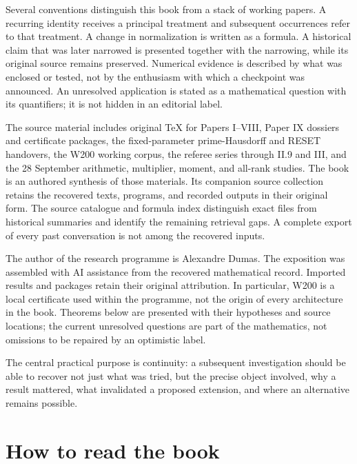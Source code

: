 \documentclass[
  10pt,
  a4paper,
  10pt,
  oneside,
  openany]{book}
\begin{document}
Several conventions distinguish this book from a stack of working
papers. A recurring identity receives a principal treatment and
subsequent occurrences refer to that treatment. A change in
normalization is written as a formula. A historical claim that was later
narrowed is presented together with the narrowing, while its original
source remains preserved. Numerical evidence is described by what was
enclosed or tested, not by the enthusiasm with which a checkpoint was
announced. An unresolved application is stated as a mathematical
question with its quantifiers; it is not hidden in an editorial label.

The source material includes original TeX for Papers I--VIII, Paper IX
dossiers and certificate packages, the fixed-parameter prime-Hausdorff
and RESET handovers, the W200 working corpus, the referee series through
II.9 and III, and the 28 September arithmetic, multiplier, moment, and
all-rank studies. The book is an authored synthesis of those materials.
Its companion source collection retains the recovered texts, programs,
and recorded outputs in their original form. The source catalogue and
formula index distinguish exact files from historical summaries and
identify the remaining retrieval gaps. A complete export of every past
conversation is not among the recovered inputs.

The author of the research programme is Alexandre Dumas. The exposition
was assembled with AI assistance from the recovered mathematical record.
Imported results and packages retain their original attribution. In
particular, W200 is a local certificate used within the programme, not
the origin of every architecture in the book. Theorems below are
presented with their hypotheses and source locations; the current
unresolved questions are part of the mathematics, not omissions to be
repaired by an optimistic label.

The central practical purpose is continuity: a subsequent investigation
should be able to recover not just what was tried, but the precise
object involved, why a result mattered, what invalidated a proposed
extension, and where an alternative remains possible.

\section*{How to read the book}\label{how-to-read-the-book}
\end{document}
